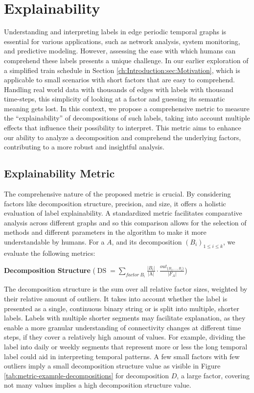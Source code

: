 \chapter{Explainability}
Understanding and interpreting labels in edge periodic temporal graphs is essential for various applications, such as network analysis, system monitoring, and predictive modeling.
However, assessing the ease with which humans can comprehend these labels presents a unique challenge.
In our earlier exploration of a simplified train schedule in Section \ref{ch:Introduction:sec:Motivation}, which is applicable to small scenarios with short factors that are easy to comprehend.
Handling real world data with thousands of edges with labels with thousand time-steps, this simplicity of looking at a factor and guessing its semantic meaning gets lost.
In this context, we propose a comprehensive metric to measure the \enquote{explainability} of decompositions of such labels, taking into account multiple effects that influence their possibility to interpret.
This metric aims to enhance our ability to analyze a decomposition and comprehend the underlying factors, contributing to a more robust and insightful analysis.

\section{Explainability Metric}
The comprehensive nature of the proposed metric is crucial.
By considering factors like decomposition structure, precision, and size, it offers a holistic evaluation of label explainability.
A standardized metric facilitates comparative analysis across different graphs and so this comparison allows for the selection of methods and different parameters in the algorithm to make it more understandable by humans.
For a \DFA $A$, and its decomposition $(B_i)_{1 \leq i \leq k}$, we evaluate the following metrics:

\textbf{Decomposition Structure} ($\operatorname{DS} = \sum\limits_{factor~ B_i}\frac{|B_i|}{\text{|A|}} \cdot \frac{out_{\{B_1,\dots,B_i\}}}{|F_A|}$)

The decomposition structure is the sum over all relative factor sizes, weighted by their relative amount of outliers.
It takes into account whether the label is presented as a single, continuous binary string or is split into multiple, shorter labels.
Labels with multiple shorter segments may facilitate explanation, as they enable a more granular understanding of connectivity changes at different time steps, if they cover a relatively high amount of values.
For example, dividing the label into daily or weekly segments that represent more or less the long temporal label could aid in interpreting temporal patterns.
A few small factors with few outliers imply a small decomposition structure value as visible in Figure \ref{tab:metric-example-decompositions} for decomposition $D$, a large factor, covering not many values implies a high decomposition structure value.

